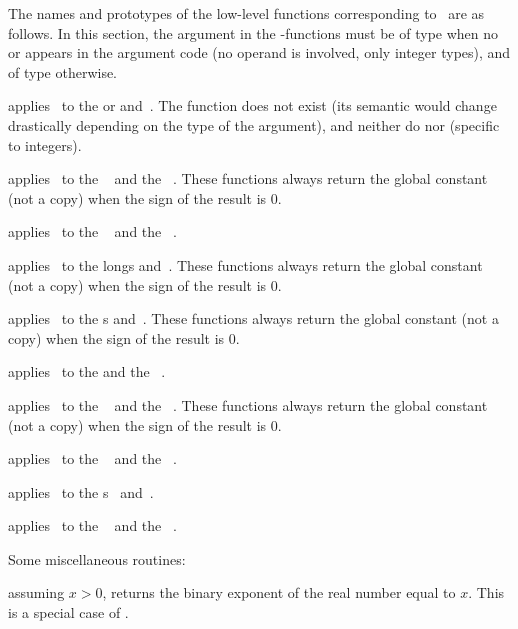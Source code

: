 The names and prototypes of the low-level functions corresponding
to \op\ are as follows. In this section, the  argument in the
-functions must be of type  when no  or 
appears in the argument code (no  operand is involved, only integer
types), and of type  otherwise.

 applies \op\ to
the  or   and~. The function
 does not exist (its semantic would change drastically
depending on the type of the  argument), and neither do
 nor  (specific to integers).

 applies \op\ to the
~ and the ~.
 These functions always return the global constant
 (not a copy) when the sign of the result is $0$.

 applies \op\ to the
~ and the ~.

 applies \op\ to the longs
 and~. These functions always return the global constant
 (not a copy) when the sign of the result is $0$.

 applies \op\ to the
s  and~. These functions always return the global
constant  (not a copy) when the sign of the result is $0$.

 applies \op\ to the
  and the ~.

 applies \op\ to the
~ and the ~. These functions always return
the global constant  (not a copy) when the sign of the result
is $0$.

 applies \op\ to the
~ and the ~.

 applies \op\ to the
s~ and~.

 applies \op\ to the
~ and the ~.

\noindent Some miscellaneous routines:

 assuming $x > 0$, returns the binary exponent of
the real number equal to $x$. This is a special case of .


